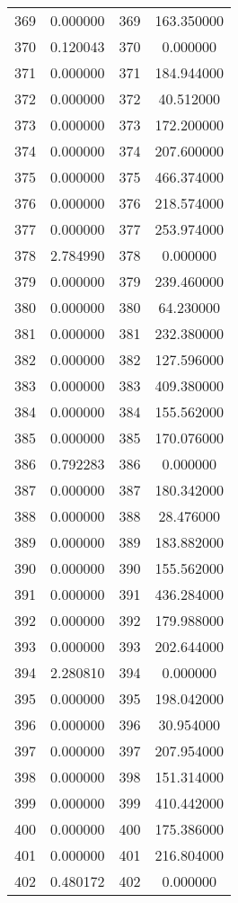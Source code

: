 \documentclass[12pt]{article}
\begin{document}
\begin{longtable}{@{}cccc@{}}
369 & 0.000000 & 369 & 163.350000 \\
370 & 0.120043 & 370 & 0.000000 \\
371 & 0.000000 & 371 & 184.944000 \\
372 & 0.000000 & 372 & 40.512000 \\
373 & 0.000000 & 373 & 172.200000 \\
374 & 0.000000 & 374 & 207.600000 \\
375 & 0.000000 & 375 & 466.374000 \\
376 & 0.000000 & 376 & 218.574000 \\
377 & 0.000000 & 377 & 253.974000 \\
378 & 2.784990 & 378 & 0.000000 \\
379 & 0.000000 & 379 & 239.460000 \\
380 & 0.000000 & 380 & 64.230000 \\
381 & 0.000000 & 381 & 232.380000 \\
382 & 0.000000 & 382 & 127.596000 \\
383 & 0.000000 & 383 & 409.380000 \\
384 & 0.000000 & 384 & 155.562000 \\
385 & 0.000000 & 385 & 170.076000 \\
386 & 0.792283 & 386 & 0.000000 \\
387 & 0.000000 & 387 & 180.342000 \\
388 & 0.000000 & 388 & 28.476000 \\
389 & 0.000000 & 389 & 183.882000 \\
390 & 0.000000 & 390 & 155.562000 \\
391 & 0.000000 & 391 & 436.284000 \\
392 & 0.000000 & 392 & 179.988000 \\
393 & 0.000000 & 393 & 202.644000 \\
394 & 2.280810 & 394 & 0.000000 \\
395 & 0.000000 & 395 & 198.042000 \\
396 & 0.000000 & 396 & 30.954000 \\
397 & 0.000000 & 397 & 207.954000 \\
398 & 0.000000 & 398 & 151.314000 \\
399 & 0.000000 & 399 & 410.442000 \\
400 & 0.000000 & 400 & 175.386000 \\
401 & 0.000000 & 401 & 216.804000 \\
402 & 0.480172 & 402 & 0.000000 \\

\end{longtable}
\end{document}
